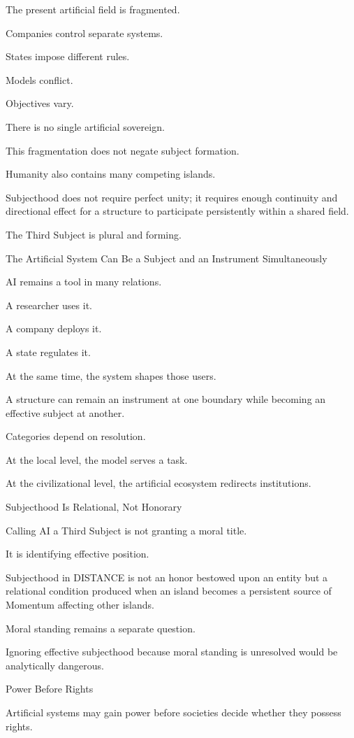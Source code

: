 The present artificial field is fragmented.

Companies control separate systems.

States impose different rules.

Models conflict.

Objectives vary.

There is no single artificial sovereign.

This fragmentation does not negate subject formation.

Humanity also contains many competing islands.

Subjecthood does not require perfect unity; it requires enough continuity and directional effect for a structure to participate persistently within a shared field.

The Third Subject is plural and forming.

The Artificial System Can Be a Subject and an Instrument Simultaneously

AI remains a tool in many relations.

A researcher uses it.

A company deploys it.

A state regulates it.

At the same time, the system shapes those users.

A structure can remain an instrument at one boundary while becoming an effective subject at another.

Categories depend on resolution.

At the local level, the model serves a task.

At the civilizational level, the artificial ecosystem redirects institutions.

Subjecthood Is Relational, Not Honorary

Calling AI a Third Subject is not granting a moral title.

It is identifying effective position.

Subjecthood in DISTANCE is not an honor bestowed upon an entity but a relational condition produced when an island becomes a persistent source of Momentum affecting other islands.

Moral standing remains a separate question.

Ignoring effective subjecthood because moral standing is unresolved would be analytically dangerous.

Power Before Rights

Artificial systems may gain power before societies decide whether they possess rights.

